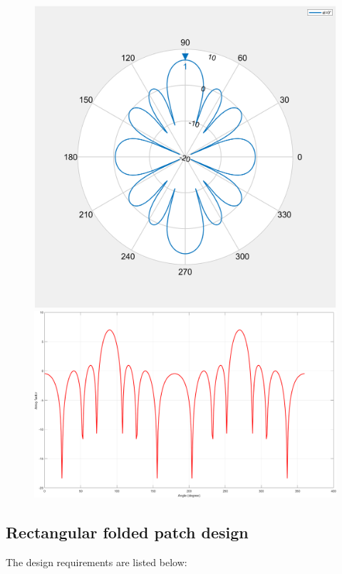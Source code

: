 \documentclass[12pt,a4paper]{book}
\begin{document}
{\begin{center}
\begin{figure}[h]
\includegraphics[scale=0.3]{array_factor_polar.png}
\includegraphics[scale=0.3]{array_factor_rectangular.png}
\end{figure}
\end{center}


\subsection*{\selectfont\color{Turquoise}Rectangular folded patch design}
The design requirements are listed below: 
\begin{center}


\end{center}}
\end{document}
